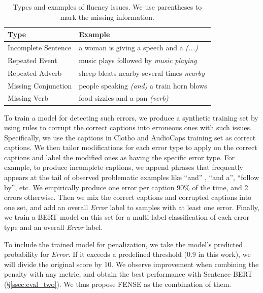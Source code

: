 \documentclass{article}
\begin{document}
\begin{table}[h]
    \centering
    \small
    \begin{tabular}{l|l}
        \hline
        Type & Example \\
        \hline
        Incomplete Sentence & a woman is giving a speech and a \textit{(...)} \\
        Repeated Event  & music plays followed by \textit{music playing} \\
        Repeated Adverb & sheep bleats nearby several times \textit{nearby} \\
        Missing Conjunction & people speaking \textit{(and)} a train horn blows \\
        Missing Verb & food sizzles and a pan \textit{(verb)} \\
        \hline
    \end{tabular}
    \caption{Types and examples of fluency issues. We use parentheses to mark the missing information.}
    \label{tab:fluency_example}
\end{table}

To train a model for detecting such errors, we produce a synthetic training set by using rules to corrupt the correct captions into erroneous ones with such issues. Specifically, we use the captions in Clotho and AudioCaps training set as correct captions. We then tailor modifications for each error type to apply on the correct captions and label the modified ones as having the specific error type. For example, to produce incomplete captions, we append phrases that frequently appears at the tail of observed problematic examples like ``and'' , ``and a'', ``follow by'', etc. We empirically produce one error per caption 90\% of the time, and 2 errors otherwise. Then we mix the correct captions and corrupted captions into one set, and add an overall \textit{Error} label to samples with at least one error. Finally, we train a BERT model on this set for a multi-label classification of each error type and an overall \textit{Error} label.

To include the trained model for penalization, we take the model's predicted probability for \textit{Error}. If it exceeds a predefined threshold (0.9 in this work), we will divide the original score by 10. We observe improvement when combining the penalty with any metric, and obtain the best performance with Sentence-BERT (\S \ref{ssec:eval_two}). We thus propose FENSE as the combination of them. 

\end{document}

